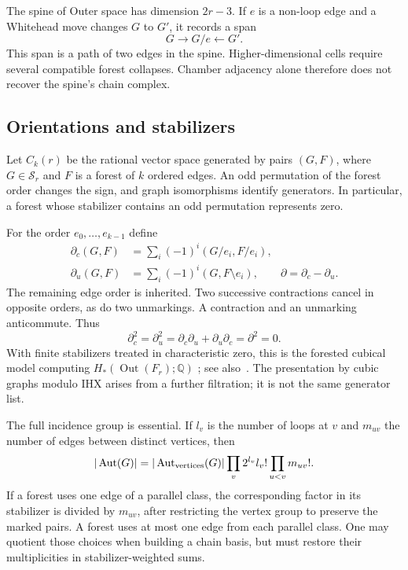 \documentclass[11pt]{article}
\theoremstyle{definition}
\newcommand{\Aut}{\operatorname{Aut}}
\newcommand{\Out}{\operatorname{Out}}
\newcommand{\Q}{\mathbb Q}
\numberwithin{equation}{section}
\begin{document}
The spine of Outer space has dimension $2r-3$. If $e$ is a non-loop
edge and a Whitehead move changes $G$ to $G'$, it records a span
\[
 G\longrightarrow G/e\longleftarrow G'.
\]
This span is a path of two edges in the spine. Higher-dimensional
cells require several compatible forest collapses. Chamber adjacency
alone therefore does not recover the spine's chain complex.

\subsection{Orientations and stabilizers}
Let $C_k(r)$ be the rational vector space generated by pairs $(G,F)$,
where $G\in\mathcal S_r$ and $F$ is a forest of $k$ ordered edges.
An odd permutation of the forest order changes the sign, and graph
isomorphisms identify generators. In particular, a forest whose
stabilizer contains an odd permutation represents zero.

For the order $e_0,\ldots,e_{k-1}$ define
\begin{align}\label{eq:differential}
 \partial_c(G,F)&=\sum_i(-1)^i(G/e_i,F/e_i),\\
 \partial_u(G,F)&=\sum_i(-1)^i(G,F\setminus e_i),\qquad
 \partial=\partial_c-\partial_u.\nonumber
\end{align}
The remaining edge order is inherited. Two successive contractions
cancel in opposite orders, as do two unmarkings. A contraction and an
unmarking anticommute. Thus
\[
 \partial_c^2=\partial_u^2
 =\partial_c\partial_u+\partial_u\partial_c=\partial^2=0.
\]
With finite stabilizers treated in characteristic zero, this is the
forested cubical model computing $H_*(\Out(F_r);\Q)$
\cite[Section 3.2, pp.~1210--1211]{ConantVogtmann};
see also~\cite[Section 2.1]{BV2023}.
The presentation by cubic graphs
modulo IHX arises from a further filtration; it is not the same
generator list.

The full incidence group is essential. If $l_v$ is the number of
loops at $v$ and $m_{uv}$ the number of edges between distinct vertices,
then
\begin{equation}\label{eq:aut}
 |\Aut(G)|=|\Aut_{\rm vertices}(G)|
               \prod_v2^{l_v}l_v!\prod_{u<v}m_{uv}!.
\end{equation}
If a forest uses one edge of a parallel class, the corresponding
factor in its stabilizer is divided by $m_{uv}$, after restricting
the vertex group to preserve the marked pairs. A forest uses at most
one edge from each parallel class. One may quotient those choices when
building a chain basis, but must restore their multiplicities in
stabilizer-weighted sums.
\end{document}
